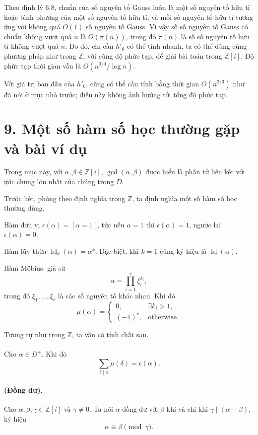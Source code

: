 \documentclass[11pt]{article}
\begin{document}
Theo định lý 6.8, chuẩn của số nguyên tố Gauss luôn là một số nguyên tố hữu
tỉ hoặc bình phương của một số nguyên tố hữu tỉ, và mỗi số nguyên tố hữu tỉ
tương ứng với không quá \(O(1)\) số nguyên tố Gauss. Vì vậy số số nguyên tố
Gauss có chuẩn không vượt quá \(n\) là \(O(\pi(n))\), trong đó \(\pi(n)\) là
số số nguyên tố hữu tỉ không vượt quá \(n\). Do đó, chỉ cần \(h'_0\) có thể
tính nhanh, ta có thể dùng cùng phương pháp như trong \(\mathbb Z\), với cùng
độ phức tạp, để giải bài toán trong \(\mathbb Z[i]\). Độ phức tạp thời gian
vẫn là \(O(n^{3/4}/\log n)\).

Với giá trị ban đầu của \(h'_0\), cũng có thể cần tính bằng thời gian
\(O(n^{2/3})\) như đã nói ở mục nhỏ trước; điều này không ảnh hưởng tới tổng
độ phức tạp.

\section*{9. Một số hàm số học thường gặp và bài ví dụ}

Trong mục này, với \(\alpha,\beta\in\mathbb Z[i]\), \(\gcd(\alpha,\beta)\)
được hiểu là phần tử liên kết với ước chung lớn nhất của chúng trong \(D\).

Trước hết, phỏng theo định nghĩa trong \(\mathbb Z\), ta định nghĩa một số
hàm số học thường dùng.

Hàm đơn vị \(\epsilon(\alpha)=[\alpha=1]\), tức nếu \(\alpha=1\) thì
\(\epsilon(\alpha)=1\), ngược lại \(\epsilon(\alpha)=0\).

Hàm lũy thừa \(\operatorname{Id}_k(\alpha)=\alpha^k\). Đặc biệt, khi \(k=1\)
cũng ký hiệu là \(\operatorname{Id}(\alpha)\).

Hàm Möbius: giả sử
\[
  \alpha=\prod_{i=1}^r\xi_i^{k_i},
\]
trong đó \(\xi_1,\ldots,\xi_r\) là các số nguyên tố khác nhau. Khi đó
\[
  \mu(\alpha)=
  \begin{cases}
    0, & \exists k_i>1,\\
    (-1)^r, & \text{otherwise}.
  \end{cases}
\]

Tương tự như trong \(\mathbb Z\), ta vẫn có tính chất sau.

\paragraph{}
Cho \(\alpha\in D^+\). Khi đó
\[
  \sum_{\delta\mid\alpha}\mu(\delta)=\epsilon(\alpha).
\]

\paragraph{ (Đồng dư).}
Cho \(\alpha,\beta,\gamma\in\mathbb Z[i]\) và \(\gamma\ne0\). Ta nói
\(\alpha\) đồng dư với \(\beta\) khi và chỉ khi \(\gamma\mid(\alpha-\beta)\),
ký hiệu
\[
  \alpha\equiv\beta\pmod\gamma.
\]
\end{document}
